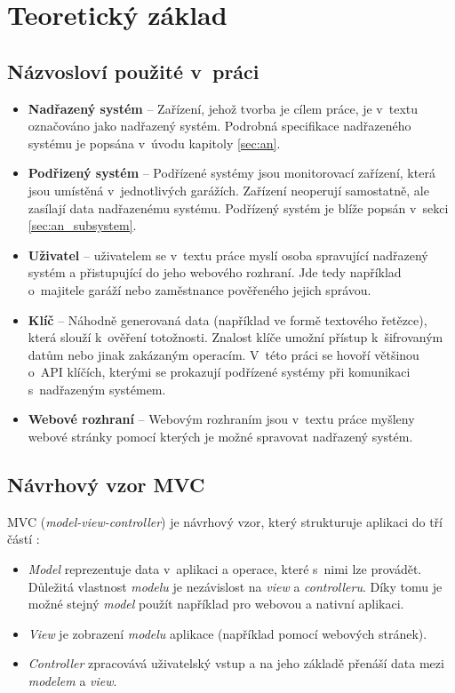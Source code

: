 \chapter{Teoretický základ}
\label{sec:te}


\section{Názvosloví použité v~práci}

\begin{itemize}
    \item \textbf{Nadřazený systém} -- Zařízení, jehož tvorba je cílem práce, je v~textu označováno jako nadřazený systém. Podrobná specifikace nadřazeného systému je popsána v~úvodu kapitoly \ref{sec:an}.
    \item \textbf{Podřizený systém} -- Podřízené systémy jsou monitorovací zařízení, která jsou umístěná v~jednotlivých garážích. Zařízení neoperují samostatně, ale zasílají data nadřazenému systému. Podřízený systém je blíže popsán v~sekci \ref{sec:an_subsystem}.
    \item \textbf{Uživatel} -- uživatelem se v~textu práce myslí osoba spravující nadřazený systém a přistupující do jeho webového rozhraní. Jde tedy například o~majitele garáží nebo zaměstnance pověřeného jejich správou.
    \item \textbf{Klíč} -- Náhodně generovaná data (například ve formě textového řetězce), která slouží k~ověření totožnosti. Znalost klíče umožní přístup k~šifrovaným datům nebo jinak zakázaným operacím. V~této práci se hovoří většinou o~API klíčích, kterými se prokazují podřízené systémy při komunikaci s~nadřazeným systémem.
    \item \textbf{Webové rozhraní} -- Webovým rozhraním jsou v~textu práce myšleny webové stránky pomocí kterých je možné spravovat nadřazený systém.
\end{itemize}

\section{Návrhový vzor MVC}

MVC (\textit{model-view-controller}) je návrhový vzor, který strukturuje aplikaci do tří částí \cite{mvc_dalling}:

\begin{itemize}
    \item \textit{Model} reprezentuje data v~aplikaci a operace, které s~nimi lze provádět. Důležitá vlastnost \textit{modelu} je nezávislost na \textit{view} a \textit{controlleru}. Díky tomu je možné stejný \textit{model} použít například pro webovou a nativní aplikaci.
    \item \textit{View} je zobrazení \textit{modelu} aplikace (například pomocí webových stránek).
    \item \textit{Controller} zpracovává uživatelský vstup a na jeho základě přenáší data mezi \textit{modelem} a \textit{view}.
\end{itemize}

